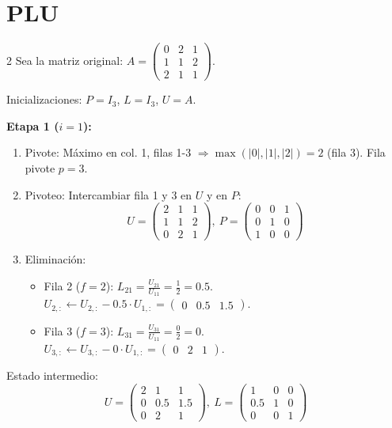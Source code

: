\documentclass[10pt]{extarticle}
\begin{document}
\section*{PLU}
\begin{multicols}{2}
Sea la matriz original: $A = \begin{pmatrix}0&2&1\\1&1&2\\2&1&1\end{pmatrix}$.

Inicializaciones: $P=I_3$, $L=I_3$, $U=A$.

\textbf{Etapa 1 ($i=1$):}
\begin{enumerate}
\item Pivote: Máximo en col. 1, filas 1-3 $\Rightarrow \max(|0|,|1|,|2|)=2$ (fila 3). Fila pivote $p=3$.
\item Pivoteo: Intercambiar fila 1 y 3 en $U$ y en $P$:
$$U=\begin{pmatrix}2&1&1\\1&1&2\\0&2&1\end{pmatrix},\ P=\begin{pmatrix}0&0&1\\0&1&0\\1&0&0\end{pmatrix}$$
\item Eliminación:
\begin{itemize}[leftmargin=1.2em]
\item Fila 2 ($f=2$): $L_{21}=\frac{U_{21}}{U_{11}}=\frac{1}{2}=0.5$. \\ $U_{2,:} \leftarrow U_{2,:}-0.5\cdot U_{1,:} = \begin{pmatrix}0&0.5&1.5\end{pmatrix}$.
\item Fila 3 ($f=3$): $L_{31}=\frac{U_{31}}{U_{11}}=\frac{0}{2}=0$. \\ $U_{3,:} \leftarrow U_{3,:}-0\cdot U_{1,:} = \begin{pmatrix}0&2&1\end{pmatrix}$.
\end{itemize}
\end{enumerate}

Estado intermedio:
$$U=\begin{pmatrix}2&1&1\\0&0.5&1.5\\0&2&1\end{pmatrix},\ L=\begin{pmatrix}1&0&0\\0.5&1&0\\0&0&1\end{pmatrix}$$


\end{multicols}
\end{document}
